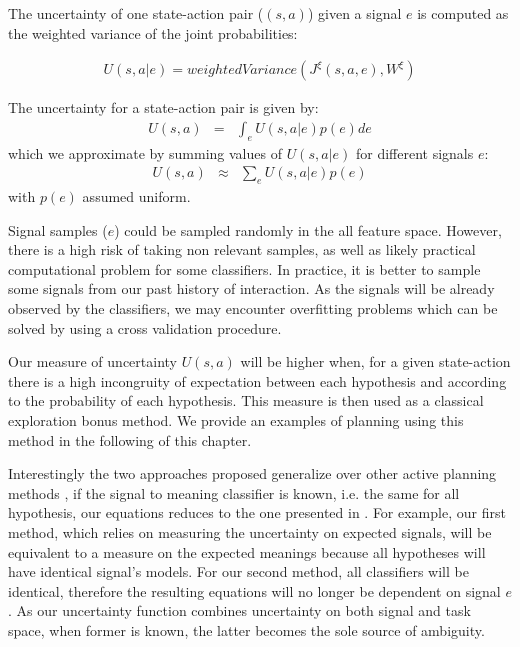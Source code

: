 The uncertainty of one state-action pair ($(s,a)$) given a signal $e$ is computed as the weighted variance of the joint probabilities:

\begin{eqnarray}
U(s,a|e) = weightedVariance(J^{\xi}(s,a,e), W^{\xi})
\label{eq:planningOneSignal}
\end{eqnarray}

The uncertainty for a state-action pair is given by:
\begin{eqnarray}
U(s,a) & = & \int_{e} U(s,a|e) p(e) de
\end{eqnarray}
which we approximate by summing values of $U(s,a|e)$ for different signals $e$:
\begin{eqnarray}
U(s,a) & \approx & \sum_{e} U(s,a|e) p(e)
\label{eq:planning}
\end{eqnarray}
with $p(e)$ assumed uniform.

Signal samples ($e$) could be sampled randomly in the all feature space. However, there is a high risk of taking non relevant samples, as well as likely practical computational problem for some classifiers. In practice, it is better to sample some signals from our past history of interaction. As the signals will be already observed by the classifiers, we may encounter overfitting problems which can be solved by using a cross validation procedure.

Our measure of uncertainty $U(s,a)$ will be higher when, for a given state-action there is a high incongruity of expectation between each hypothesis and according to the probability of each hypothesis. This measure is then used as a classical exploration bonus method. We provide an examples of planning using this method in the following of this chapter.

\transition

Interestingly the two approaches proposed generalize over other active planning methods \cite{lopes2009active}, if the signal to meaning classifier is known, i.e. the same for all hypothesis, our equations reduces to the one presented in \cite{macl11simul}. For example, our first method, which relies on measuring the uncertainty on expected signals, will be equivalent to a measure on the expected meanings because all hypotheses will have identical signal's models. For our second method, all classifiers will be identical, therefore the resulting equations will no longer be dependent on signal $e$. As our uncertainty function combines uncertainty on both signal and task space, when former is known, the latter becomes the sole source of ambiguity.

